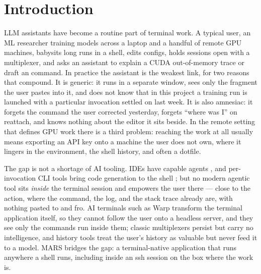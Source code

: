 \section{Introduction}

LLM assistants have become a routine part of terminal work. A typical user, an ML
researcher training models across a laptop and a handful of remote GPU machines,
babysits long runs in a shell, edits configs, holds sessions open with a multiplexer,
and asks an assistant to explain a CUDA out-of-memory trace or draft an 
command. In practice the assistant is the weakest link, for two reasons that compound. It is generic: it runs in a separate window,
sees only the fragment the user pastes into it, and does not know that in this project a
training run is launched with a particular  invocation settled on last
week. It is also amnesiac: it forgets the command the user corrected yesterday, forgets ``where
was I'' on reattach, and knows nothing about the editor
it sits beside. In the remote setting that defines GPU work there is a third problem:
reaching the work at all usually means exporting an API key onto a machine the user does
not own, where it lingers in the environment, the shell history, and often a dotfile.

The gap is not a shortage of AI tooling. IDEs have capable agents \citep{cursor}, and
per-invocation CLI tools bring code generation to the shell
\citep{anthropic2024claudecode,copilotcli}; but no modern agentic tool sits
\emph{inside} the terminal session and empowers the user there --- close to the
action, where the command, the log, and the stack trace already are, with nothing
pasted to and fro. AI terminals such as Warp \citep{warp} transform the terminal
application itself, so they cannot follow the user onto a headless server, and they
see only the commands run inside them; classic multiplexers \citep{tmux,zellij}
persist but carry no intelligence, and history tools \citep{atuin,thefuck} treat the
user's history as valuable but never feed it to a model. MARS bridges the gap: a
terminal-native application that runs anywhere a shell runs, including inside an ssh
session on the box where the work is.

